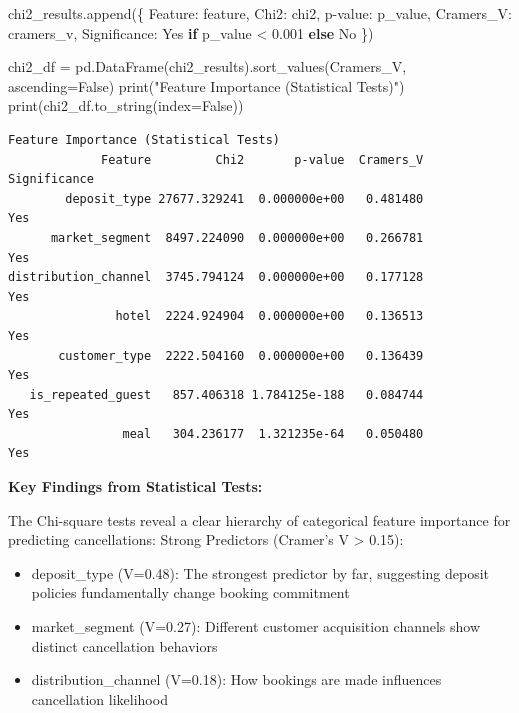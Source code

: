 \documentclass[
  letterpaper,
  DIV=11,
  numbers=noendperiod]{scrartcl}
\newenvironment{Shaded}{\begin{snugshade}}{\end{snugshade}}
\newcommand{\BuiltInTok}[1]{\textcolor[rgb]{0.00,0.23,0.31}{#1}}
\newcommand{\ControlFlowTok}[1]{\textcolor[rgb]{0.00,0.23,0.31}{\textbf{#1}}}
\newcommand{\FloatTok}[1]{\textcolor[rgb]{0.68,0.00,0.00}{#1}}
\newcommand{\NormalTok}[1]{\textcolor[rgb]{0.00,0.23,0.31}{#1}}
\newcommand{\OperatorTok}[1]{\textcolor[rgb]{0.37,0.37,0.37}{#1}}
\newcommand{\StringTok}[1]{\textcolor[rgb]{0.13,0.47,0.30}{#1}}
\newcommand{\VariableTok}[1]{\textcolor[rgb]{0.07,0.07,0.07}{#1}}
\providecommand{\tightlist}{%
  \setlength{\itemsep}{0pt}\setlength{\parskip}{0pt}}
\renewenvironment{Shaded}{%
  \begin{tcolorbox}[%
    enhanced,%
    colback=codebg,%
    colframe=codebg,%
    borderline west={3pt}{0pt}{sectionblue},%
    fontupper=\small\ttfamily,%
    boxrule=0pt,%
    arc=0pt,%
    boxsep=5pt,%
    left=2mm,%
    right=2mm,%
    top=2mm,%
    bottom=2mm%
  ]%
}{%
  \end{tcolorbox}%
}
\begin{document}
\begin{Shaded}
\begin{Highlighting}[]
\NormalTok{    chi2\_results.append(\{}
        \StringTok{\textquotesingle{}Feature\textquotesingle{}}\NormalTok{: feature,}
        \StringTok{\textquotesingle{}Chi2\textquotesingle{}}\NormalTok{: chi2,}
        \StringTok{\textquotesingle{}p{-}value\textquotesingle{}}\NormalTok{: p\_value,}
        \StringTok{\textquotesingle{}Cramers\_V\textquotesingle{}}\NormalTok{: cramers\_v,}
        \StringTok{\textquotesingle{}Significance\textquotesingle{}}\NormalTok{: }\StringTok{\textquotesingle{}Yes\textquotesingle{}} \ControlFlowTok{if}\NormalTok{ p\_value }\OperatorTok{\textless{}} \FloatTok{0.001} \ControlFlowTok{else} \StringTok{\textquotesingle{}No\textquotesingle{}}
\NormalTok{    \})}

\NormalTok{chi2\_df }\OperatorTok{=}\NormalTok{ pd.DataFrame(chi2\_results).sort\_values(}\StringTok{\textquotesingle{}Cramers\_V\textquotesingle{}}\NormalTok{, ascending}\OperatorTok{=}\VariableTok{False}\NormalTok{)}
\BuiltInTok{print}\NormalTok{(}\StringTok{"Feature Importance (Statistical Tests)"}\NormalTok{)}
\BuiltInTok{print}\NormalTok{(chi2\_df.to\_string(index}\OperatorTok{=}\VariableTok{False}\NormalTok{))}
\end{Highlighting}
\end{Shaded}

\begin{verbatim}
Feature Importance (Statistical Tests)
             Feature         Chi2       p-value  Cramers_V Significance
        deposit_type 27677.329241  0.000000e+00   0.481480          Yes
      market_segment  8497.224090  0.000000e+00   0.266781          Yes
distribution_channel  3745.794124  0.000000e+00   0.177128          Yes
               hotel  2224.924904  0.000000e+00   0.136513          Yes
       customer_type  2222.504160  0.000000e+00   0.136439          Yes
   is_repeated_guest   857.406318 1.784125e-188   0.084744          Yes
                meal   304.236177  1.321235e-64   0.050480          Yes
\end{verbatim}

\textbf{Key Findings from Statistical Tests:}

The Chi-square tests reveal a clear hierarchy of categorical feature
importance for predicting cancellations: Strong Predictors (Cramer's V
\textgreater{} 0.15):

\begin{itemize}
\tightlist
\item
  deposit\_type (V=0.48): The strongest predictor by far, suggesting
  deposit policies fundamentally change booking commitment
\item
  market\_segment (V=0.27): Different customer acquisition channels show
  distinct cancellation behaviors
\item
  distribution\_channel (V=0.18): How bookings are made influences
  cancellation likelihood
\end{itemize}
\end{document}
